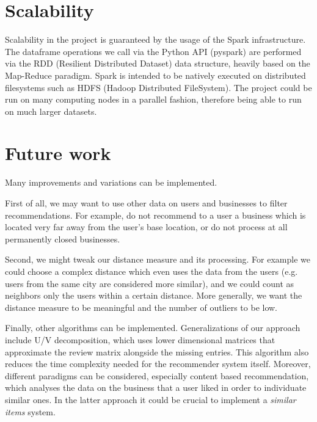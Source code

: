 \documentclass[11pt,a4paper]{article}
\begin{document}
\begin{multicols}{2}
\label{scalability}
\section{Scalability}
Scalability in the project is guaranteed by the usage of the Spark infrastructure.
The dataframe operations we call via the Python API (pyspark) are performed via the RDD (Resilient Distributed Dataset) data structure, heavily based on the Map-Reduce paradigm.
Spark is intended to be natively executed on distributed filesystems such as HDFS (Hadoop Distributed FileSystem).
The project could be run on many computing nodes in a parallel fashion, therefore being able to run on much larger datasets.



\label{futurework}
\section{Future work}
Many improvements and variations can be implemented.

First of all, we may want to use other data on users and businesses to filter recommendations.
For example, do not recommend to a user a business which is located very far away from the user's base location, or do not process at all permanently closed businesses.

Second, we might tweak our distance measure and its processing.
For example we could choose a complex distance which even uses the data from the users (e.g. users from the same city are considered more similar), and we could count  as neighbors only the users within a certain distance.
More generally, we want the distance measure to be meaningful and the number of outliers to be low.

Finally, other algorithms can be implemented.
Generalizations of our approach include U/V decomposition, which uses lower dimensional matrices that approximate the review matrix alongside the missing entries.
This algorithm also reduces the time complexity needed for the recommender system itself.
Moreover, different paradigms can be considered, especially content based recommendation, which analyses the data on the business that a user liked in order to individuate similar ones.
In the latter approach it could be crucial to implement a \emph{similar items} system.


\end{multicols}
\end{document}
